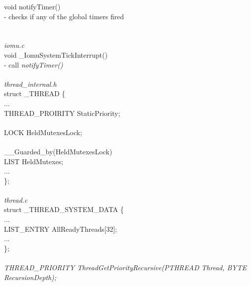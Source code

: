 \documentclass{report}
\begin{document}
	void notifyTimer(){}\\
		- checks if any of the global timers fired\\
\\
\\
	\textit{iomu.c}\\
	void \_IomuSystemTickInterrupt(){}\\
		- call \textit{notifyTimer()}\\
\\
	\textit{thread\_internal.h} \\
	struct \_THREAD \{\\
		...\\
		THREAD\_PROIRITY StaticPriority;\\
\\
		LOCK HeldMutexesLock;\\
\\
		\_\_Guarded\_by(HeldMutexesLock) \\
		LIST HeldMutexes;\\
		...\\
	\};\\
\\
	\textit{thread.c}\\ 
	struct \_THREAD\_SYSTEM\_DATA \{\\
		...\\
		LIST\_ENTRY AllReadyThreads[32];\\
		...\\
	\};\\
\\
	\textit{THREAD\_PRIORITY ThreadGetPriorityRecursive(PTHREAD Thread, BYTE RecursionDepth);}
\end{document}
